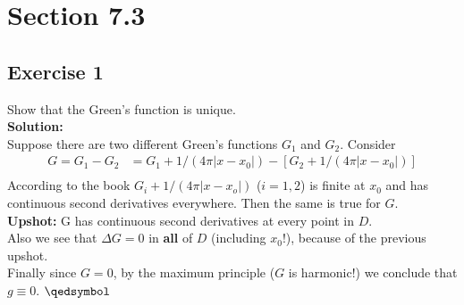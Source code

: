 \documentclass[12pt]{article}%
\begin{document}
\section*{Section 7.3}
\subsection*{Exercise 1}
Show that the Green's function is unique.\\
\textbf{Solution:}\\
Suppose there are two different Green's functions $G_1$ and $G_2$. Consider
\begin{align*}
    G=G_1-G_2&= G_1 + 1/(4\pi |x-x_0|) - [G_2 + 1/(4\pi |x-x_0|)]\\
\end{align*}
According to the book $G_i+1/(4\pi|x-x_o|)$ ($i=1,2$) is finite at $x_0$ and has
continuous second derivatives everywhere. Then the same is true for $G$.\\
\textbf{Upshot:} G has continuous second derivatives at every point in $D$.\\
Also we see that $\Delta G =0$ in \textbf{all} of $D$ (including $x_0$!),
because of the previous upshot.\\
Finally since $G=0$, by the maximum principle ($G$ is harmonic!) we conclude
that $g\equiv0$. $\qedsymbol$
\end{document}
